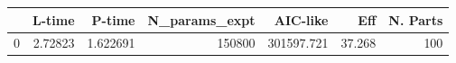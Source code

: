 \begin{tabular}{lrrrrrr}
\toprule
{} &   L-time &    P-time &  N\_params\_expt &    AIC-like &     Eff &  N. Parts \\
\midrule
0 &  2.72823 &  1.622691 &         150800 &  301597.721 &  37.268 &       100 \\
\bottomrule
\end{tabular}
